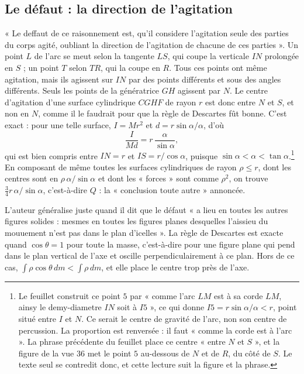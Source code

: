 \documentclass[11pt,a4paper]{article}
\begin{document}
\subsection*{Le défaut : la direction de l'agitation}

« Le deffaut de ce raisonnement est, qu'il considere l'agitation seule des
parties du corps agité, oubliant la direction de l'agitation de chacune de ces
parties ». Un point \(L\) de l'arc se meut selon la tangente \(LS\), qui coupe
la verticale \(IN\) prolongée en \(S\) ; un point \(T\) selon \(TR\), qui la
coupe en \(R\). Tous ces points ont même agitation, mais ils agissent sur
\(IN\) par des points différents et sous des angles différents. Seuls les
points de la génératrice \(GH\) agissent par \(N\). Le centre d'agitation d'une
surface cylindrique \(CGHF\) de rayon \(r\) est donc entre \(N\) et \(S\), et
non en \(N\), comme il le faudrait pour que la règle de Descartes fût bonne.
C'est exact : pour une telle surface, \(I=Mr^2\) et
\(d=r\sin\alpha/\alpha\), d'où
\[
\frac{I}{Md}=r\,\frac{\alpha}{\sin\alpha},
\]
qui est bien compris entre \(IN=r\) et \(IS=r/\cos\alpha\), puisque
\(\sin\alpha<\alpha<\tan\alpha\).\footnote{Le feuillet construit ce point \(5\)
par « comme l'arc \(LM\) est à sa corde \(LM\), ainsy le demy-diametre \(IN\)
soit à \(I5\) », ce qui donne \(I5=r\sin\alpha/\alpha<r\), point situé entre
\(I\) et \(N\). Ce serait le centre de gravité de l'arc, non son centre de
percussion. La proportion est renversée : il faut « comme la corde est à
l'arc ». La phrase précédente du feuillet place ce centre « entre \(N\) et
\(S\) », et la figure de la vue 36 met le point \(5\) au-dessous de \(N\) et de
\(R\), du côté de \(S\). Le texte seul se contredit donc, et cette lecture suit
la figure et la phrase.} En composant de même toutes les surfaces
cylindriques de rayon \(\rho\le r\), dont les centres sont en
\(\rho\,\alpha/\sin\alpha\) et dont les « forces » sont comme \(\rho^2\), on
trouve \(\tfrac34 r\,\alpha/\sin\alpha\), c'est-à-dire \(Q\) : la
« conclusion toute autre » annoncée.

L'auteur généralise juste quand il dit que le défaut « a lieu en toutes les
autres figures solides : mesmes en toutes les figures planes desquelles
l'aissieu du mouuement n'est pas dans le plan d'icelles ». La règle de
Descartes est exacte quand \(\cos\theta=1\) pour toute la masse, c'est-à-dire
pour une figure plane qui pend dans le plan vertical de l'axe et oscille
perpendiculairement à ce plan. Hors de ce cas, \(\int\rho\cos\theta\,dm<\int\rho\,dm\),
et elle place le centre trop près de l'axe.
\end{document}
